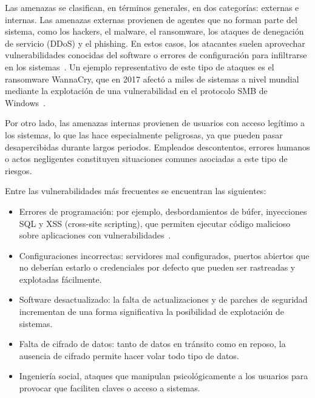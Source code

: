 Las amenazas se clasifican, en términos generales, en dos categorías: externas e internas. Las amenazas externas provienen de agentes que no forman parte del sistema, como los hackers, el malware, el ransomware, los ataques de denegación de servicio (DDoS) y el phishing. En estos casos, los atacantes suelen aprovechar vulnerabilidades conocidas del software o errores de configuración para infiltrarse en los sistemas~\cite{Pfleeger2007}. Un ejemplo representativo de este tipo de ataques es el ransomware WannaCry, que en 2017 afectó a miles de sistemas a nivel mundial mediante la explotación de una vulnerabilidad en el protocolo SMB de Windows~\cite{Symantec2017}.

Por otro lado, las amenazas internas provienen de usuarios con acceso legítimo a los sistemas, lo que las hace especialmente peligrosas, ya que pueden pasar desapercibidas durante largos periodos. Empleados descontentos, errores humanos o actos negligentes constituyen situaciones comunes asociadas a este tipo de riesgos.

Entre las vulnerabilidades más frecuentes se encuentran las siguientes:
\begin{itemize}
    \item Errores de programación: por ejemplo, desbordamientos de búfer, inyecciones SQL y XSS (cross-site scripting), que permiten ejecutar código malicioso sobre aplicaciones con vulnerabilidades~\cite{OWASP2021}.
    \item Configuraciones incorrectas: servidores mal configurados, puertos abiertos que no deberían estarlo o credenciales por defecto que pueden ser rastreadas y explotadas fácilmente.

    \item Software desactualizado: la falta de actualizaciones y de parches de seguridad incrementan de una forma significativa la posibilidad de explotación de sistemas.

    \item Falta de cifrado de datos: tanto de datos en tránsito como en reposo, la ausencia de cifrado permite hacer volar todo tipo de datos.

    \item Ingeniería social, ataques que manipulan psicológicamente a los usuarios para provocar que faciliten claves o acceso a sistemas.
    
\end{itemize}

